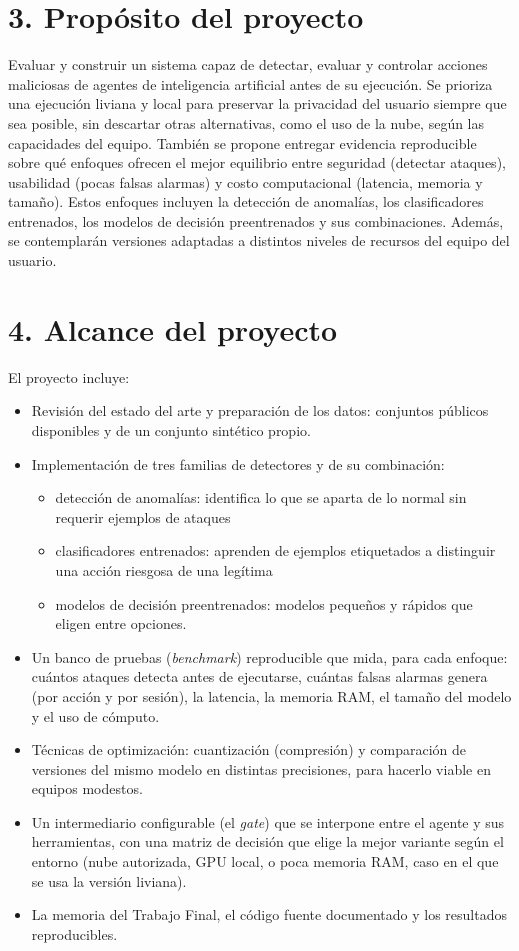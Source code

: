 \documentclass[
11pt, %
]{charter}
\begin{document}
\section{3. Propósito del proyecto}
\label{sec:proposito}

Evaluar y construir un sistema capaz de detectar, evaluar y controlar acciones maliciosas de agentes de inteligencia artificial antes de su ejecución. Se prioriza una ejecución liviana y local para preservar la privacidad del usuario siempre que sea posible, sin descartar otras alternativas, como el uso de la nube, según las capacidades del equipo. También se propone entregar evidencia reproducible sobre qué enfoques ofrecen el mejor equilibrio entre seguridad (detectar ataques), usabilidad (pocas falsas alarmas) y costo computacional (latencia, memoria y tamaño). Estos enfoques incluyen la detección de anomalías, los clasificadores entrenados, los modelos de decisión preentrenados y sus combinaciones. Además, se contemplarán versiones adaptadas a distintos niveles de recursos del equipo del usuario.

\section{4. Alcance del proyecto}
\label{sec:alcance}

El proyecto incluye:
\begin{itemize}
	\item Revisión del estado del arte y preparación de los datos: conjuntos públicos disponibles y de un conjunto sintético propio.
	\item Implementación de tres familias de detectores y de su combinación:
		\begin{itemize}
		\item detección de anomalías: identifica lo que se aparta de lo normal sin requerir ejemplos de ataques
		\item clasificadores entrenados: aprenden de ejemplos etiquetados a distinguir una acción riesgosa de una legítima
		\item modelos de decisión preentrenados: modelos pequeños y rápidos que eligen entre opciones.
		\end{itemize}
	\item Un banco de pruebas (\textit{benchmark}) reproducible que mida, para cada enfoque: cuántos ataques detecta antes de ejecutarse, cuántas falsas alarmas genera (por acción y por sesión), la latencia, la memoria RAM, el tamaño del modelo y el uso de cómputo.
	\item Técnicas de optimización: cuantización (compresión) y comparación de versiones del mismo modelo en distintas precisiones, para hacerlo viable en equipos modestos.
	\item Un intermediario configurable (el \textit{gate}) que se interpone entre el agente y sus herramientas, con una matriz de decisión que elige la mejor variante según el entorno (nube autorizada, GPU local, o poca memoria RAM, caso en el que se usa la versión liviana).
	\item La memoria del Trabajo Final, el código fuente documentado y los resultados reproducibles.
\end{itemize}
\end{document}
